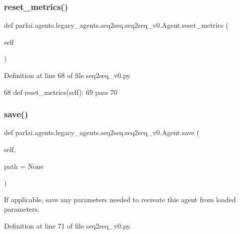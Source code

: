 \subsubsection{\texorpdfstring{reset\+\_\+metrics()}{reset\_metrics()}}
{\footnotesize\ttfamily def parlai.\+agents.\+legacy\+\_\+agents.\+seq2seq.\+seq2seq\+\_\+v0.\+Agent.\+reset\+\_\+metrics (\begin{DoxyParamCaption}\item[{}]{self }\end{DoxyParamCaption})}



Definition at line 68 of file seq2seq\+\_\+v0.\+py.


\begin{DoxyCode}
68     \textcolor{keyword}{def }reset\_metrics(self):
69         \textcolor{keywordflow}{pass}
70 
\end{DoxyCode}
\mbox{\label{classparlai_1_1agents_1_1legacy__agents_1_1seq2seq_1_1seq2seq__v0_1_1Agent_a7bb24c12c27de36cc7ca6a200ffa9aa1}} 
\subsubsection{\texorpdfstring{save()}{save()}}
{\footnotesize\ttfamily def parlai.\+agents.\+legacy\+\_\+agents.\+seq2seq.\+seq2seq\+\_\+v0.\+Agent.\+save (\begin{DoxyParamCaption}\item[{}]{self,  }\item[{}]{path = {\ttfamily None} }\end{DoxyParamCaption})}

\begin{DoxyVerb}If applicable, save any parameters needed to recreate this agent from loaded
parameters.
\end{DoxyVerb}
 

Definition at line 71 of file seq2seq\+\_\+v0.\+py.


